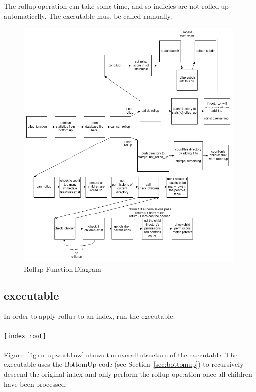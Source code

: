 The rollup operation can take some time, and so indicies are not
rolled up automatically. The \rollup executable must be called
manually.

\begin{figure} [!h]
  \centering
  \includegraphics[width=\textwidth]{images/rollup_function.png}
  \caption{Rollup Function Diagram}
\end{figure}

\subsection{\rollup executable}
In order to apply rollup to an index, run the \rollup executable:
\\\\
\indent \rollup \texttt{[index root]}
\\\\
Figure~\ref{fig:rollupworkflow} shows the overall structure of the \rollup
executable. The \rollup executable uses the BottomUp code (see
Section~\ref{sec:bottomup}) to recursively descend the original index and only
perform the rollup operation once all children have been processed.


